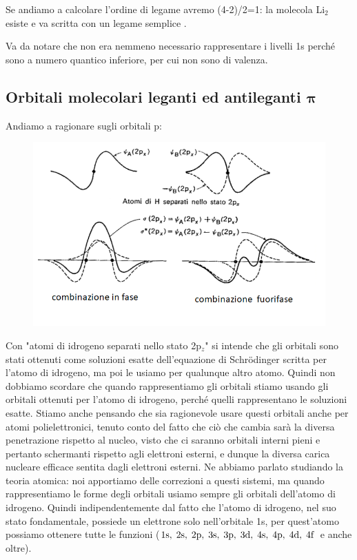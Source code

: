 \vspace{0.2cm}Se andiamo a calcolare l'ordine di legame avremo (4-2)/2=1: la molecola Li$_2$ esiste e va scritta con un legame semplice .

\vspace{0.2cm}Va da notare che non era nemmeno necessario rappresentare i livelli 1s perché sono a numero quantico inferiore, per cui non sono di valenza.
\newpage
\subsection{Orbitali molecolari leganti ed antileganti $\boldsymbol{\pi}$}
Andiamo a ragionare sugli orbitali p:

\begin{figure}[htp]
    \centering
    \includegraphics[width=14cm]{immagini/orbitali_molecolari_pigreco.png}
\end{figure}

\vspace{-1cm}Con "atomi di idrogeno separati nello stato 2p$_z$" si intende che gli orbitali sono stati ottenuti come soluzioni esatte dell'equazione di Schrödinger scritta per l'atomo di idrogeno, ma poi le usiamo per qualunque altro atomo. Quindi non dobbiamo scordare che quando rappresentiamo gli orbitali stiamo usando gli orbitali ottenuti per l'atomo di idrogeno, perché quelli rappresentano le soluzioni esatte. Stiamo anche pensando che sia ragionevole usare questi orbitali anche per atomi polielettronici, tenuto conto del fatto che ciò che cambia sarà la diversa penetrazione rispetto al nucleo, visto che ci saranno orbitali interni pieni e pertanto schermanti rispetto agli elettroni esterni, e dunque la diversa carica nucleare efficace sentita dagli elettroni esterni. Ne abbiamo parlato studiando la teoria atomica: noi apportiamo delle correzioni a questi sistemi, ma quando rappresentiamo le forme degli orbitali usiamo sempre gli orbitali dell'atomo di idrogeno. Quindi indipendentemente dal fatto che l'atomo di idrogeno, nel suo stato fondamentale, possiede un elettrone solo nell'orbitale 1s, per quest'atomo possiamo ottenere tutte le funzioni ($ \rm 1s, \; 2s, \; 2p, \; 3s, \; 3p, \; 3d, \; 4s, \; 4p, \; 4d, \; 4f$ e anche oltre).

